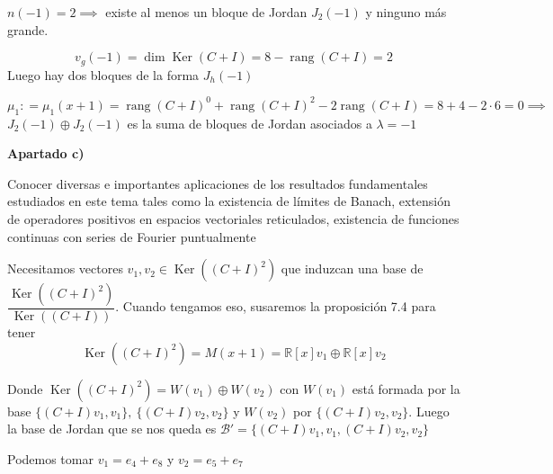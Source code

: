 \documentclass[openany]{book}
\begin{document}
\begin{exercise}
$ n(-1) = 2 \implies$ existe al menos un bloque de Jordan $ J_2(-1)$ y ninguno más grande.

$$ v_{g}(-1) = \operatorname{dim} \operatorname{Ker}(C+I) = 8 - \operatorname{rang}(C+I) = 2 $$
Luego hay dos bloques de la forma $ J_{h} (-1)$

$$ \mu_1 : = \mu_1(x+1) = \operatorname{rang}(C+I)^{0} + \operatorname{rang}(C+I)^2 -2 \operatorname{rang}(C+I) = 8+4-2\cdot 6=0 \implies  $$
$ J_2(-1)\oplus J_2(-1)$ es la suma de bloques de Jordan asociados a $ \lambda  = -1$

\begin{flushright}
    \textbf{Apartado c)}
\end{flushright}Conocer diversas e importantes aplicaciones de los resultados fundamentales
estudiados en este tema tales como la existencia de límites de Banach,
extensión de operadores positivos en espacios vectoriales reticulados,
existencia de funciones continuas con series de Fourier puntualmente

Necesitamos vectores $ v_1,v_2\in \operatorname{Ker}((C+I)^2) $ que induzcan una base de $ \dfrac{\operatorname{Ker}((C+I)^2)}{\operatorname{Ker}((C+I))}$. Cuando tengamos eso, susaremos la proposición 7.4 para tener
$$ \operatorname{Ker}((C+I)^2) = M(x+1) = \mathbb{R}[x]v_1 \oplus \mathbb{R}[x]v_2 $$

Donde $ \operatorname{Ker}((C+I)^2) = W(v_1)\oplus W(v_2)$ con $ W(v_1)$ está formada por la base $ \{(C+I)v_1,v_1\},\ \{(C+I)v_2,v_2\}$ y $ W(v_2)$ por $ \{(C+I)v_2,v_2\}$. Luego la base de Jordan que se nos queda es $ \mathcal{B}' = \{(C+I)v_1,v_1,(C+I)v_2,v_2\}$

Podemos tomar $ v_1 = e_4+e_8$ y $ v_2 = e_5+e_7$

\end{exercise}
\end{document}
